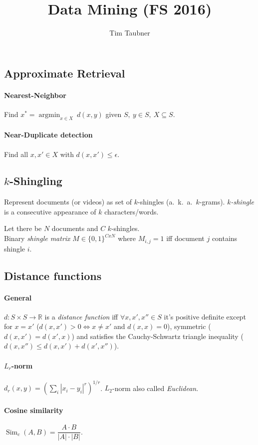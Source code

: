 \documentclass[a4paper, 9pt, DIV=24]{scrartcl}
\title{Data Mining (FS 2016)}
\author{Tim Taubner}
\DeclareMathOperator{\argmin}{argmin}
\DeclareMathOperator{\Sim}{Sim}
\newcommand{\R}{\mathbb{R}}
\begin{document}
\pagestyle{fancy}
\fancyhf{}
\fancyhead[L]{\title}

\begin{twocolumn}

\section{Approximate Retrieval}
\paragraph{Nearest-Neighbor} Find $x^* = \argmin_{x \in X} \ d(x,y)$
given $S,\ y \in S,\ X\subseteq S$.
\paragraph{Near-Duplicate detection}
Find all $x, x'\in X$ with $d(x,x') \leq \epsilon$.
\subsection{$k$-Shingling}
Represent documents (or videos) as set of $k$-shingles (a.\ k.\ a.\ $k$-grams).
\emph{$k$-shingle} is a consecutive appearance of $k$ characters/words.

Let there be $N$ documents and $C$ $k$-shingles. \\
Binary \emph{shingle matrix} $M \in \{0,1\}^{CxN}$ where $M_{i,j} = 1$ iff document $j$ contains shingle $i$.
\subsection{Distance functions}
\paragraph{General}
$d: S \times S \rightarrow \R$ is a \emph{distance function} iff $\forall x,x',x''\in S$ it's positive definite except for $x=x'$ ($d(x,x') > 0 \iff x \neq x'$ and $d(x,x) = 0$), symmetric ($d(x,x') = d(x',x)$) and satisfies the Cauchy-Schwartz triangle inequality ($d(x,x'') \leq d(x,x') + d(x',x'')$).
\paragraph{$L_r$-norm}
$d_r(x,y) = (\sum_i |x_i - y_i|^r)^{1/r}$. $L_2$-norm also called \emph{Euclidean}.
\paragraph{Cosine similarity} $\Sim_c(A,B) = \dfrac{A \cdot B}{|A|\cdot|B|}.$ 

\end{twocolumn}
\end{document}

